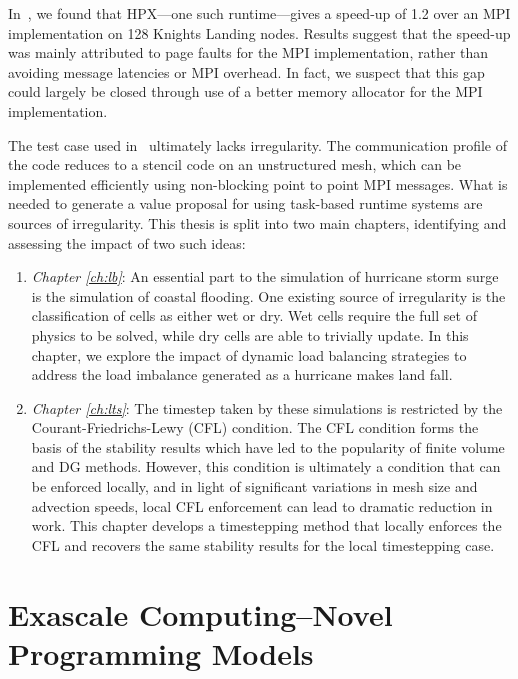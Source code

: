In~\cite{Bremer2019}, we found that HPX---one such runtime---gives a speed-up of 1.2 over an MPI implementation on 128 Knights Landing nodes. Results suggest that the speed-up was mainly attributed to page faults for the MPI implementation, rather than avoiding message latencies or MPI overhead. In fact, we suspect that this gap could largely be closed through use of a better memory allocator for the MPI implementation. 


The test case used in~\cite{Bremer2019} ultimately lacks irregularity. The communication profile of the code reduces to a stencil code on an unstructured mesh, which can be implemented efficiently using non-blocking point to point MPI messages. What is needed to generate a value proposal for using task-based runtime systems are sources of irregularity. This thesis is split into two main chapters, identifying and assessing the impact of two such ideas:
\begin{enumerate}
\item {\em Chapter \ref{ch:lb}}: An essential part to the simulation of hurricane storm surge is the simulation of coastal flooding. One existing source of irregularity is the classification of cells as either wet or dry. Wet cells require the full set of physics to be solved, while dry cells are able to trivially update. In this chapter, we explore the impact of dynamic load balancing strategies to address the load imbalance generated as a hurricane makes land fall.
\item {\em Chapter \ref{ch:lts}}: The timestep taken by these simulations is restricted by the Courant-Friedrichs-Lewy (CFL) condition. The CFL condition forms the basis of the stability results which have led to the popularity of finite volume and DG methods. However, this condition is ultimately a condition that can be enforced locally, and in light of significant variations in mesh size and advection speeds, local CFL enforcement can lead to dramatic reduction in work. This chapter develops a timestepping method that locally enforces the CFL and recovers the same stability results for the local timestepping case.
\end{enumerate}




\section{Exascale Computing--Novel Programming Models} %


%